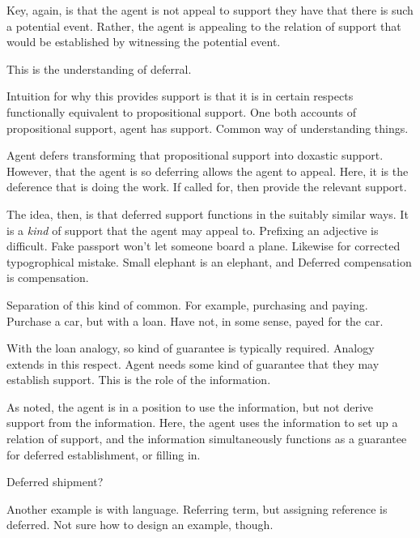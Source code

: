 \begin{note}[Deferring]
  Key, again, is that the agent is not appeal to support they have that there is such a potential event.
  Rather, the agent is appealing to the relation of support that would be established by witnessing the potential event.

  This is the understanding of deferral.

  Intuition for why this provides support is that it is in certain respects functionally equivalent to propositional support.
  One both accounts of propositional support, agent has support.
  Common way of understanding things.

  Agent defers transforming that propositional support into doxastic support.
  However, that the agent is so deferring allows the agent to appeal.
  Here, it is the deference that is doing the work.
  If called for, then provide the relevant support.

  The idea, then, is that deferred support functions in the suitably similar ways.
  It is a \emph{kind} of support that the agent may appeal to.
  Prefixing an adjective is difficult.
  Fake passport won't let someone board a plane.
  Likewise for corrected typogrophical mistake.
  Small elephant is an elephant, and Deferred compensation is compensation.
\end{note}


\begin{note}
  Separation of this kind of common.
  For example, purchasing and paying.
  Purchase a car, but with a loan.
  Have not, in some sense, payed for the car.

  With the loan analogy, so kind of guarantee is typically required.
  Analogy extends in this respect.
  Agent needs some kind of guarantee that they may establish support.
  This is the role of the information.

  As noted, the agent is in a position to use the information, but not derive support from the information.
  Here, the agent uses the information to set up a relation of support, and the information simultaneously functions as a guarantee for deferred establishment, or filling in.

  Deferred shipment?

  Another example is with language.
  Referring term, but assigning reference is deferred.
  Not sure how to design an example, though.
\end{note}


